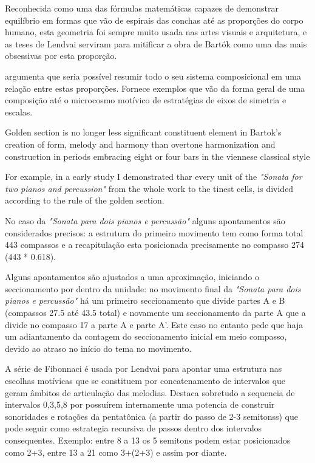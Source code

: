 \documentclass[
	12pt,				%
	openright,			%
	twoside,			%
	a4paper,			%
	english,			%
	french,				%
	spanish,			%
	brazil				%
	]{abntex2}
\begin{document}
Reconhecida como uma das fórmulas matemáticas capazes de demonstrar equilíbrio em formas que vão de espirais das conchas até as proporções do corpo humano, esta geometria foi sempre muito usada nas artes visuais e arquitetura, e as teses de Lendvai serviram para mitificar a obra de Bartók como uma das mais obsessivas por esta proporção.

 argumenta que seria possível resumir todo o seu sistema composicional em uma relação entre estas proporções. Fornece exemplos que vão da forma geral de uma composição até o microcosmo motívico de estratégias de eixos de simetria e escalas.


\begin{citacao}
Golden section is no longer less significant constituent element in Bartok's creation of form, melody and harmony than overtone harmonization and construction in periods embracing eight or four bars in the viennese classical style

For example, in a early study I demonstrated thar every unit of the \textit{"Sonata for two pianos and percussion"} from the whole work to the tinest cells, is divided according to the rule of the golden section.\cite[ p.175]{lendvai1962duality}
\end{citacao}

No caso da \textit{"Sonata para dois pianos e percussão"} alguns apontamentos são considerados precisos: a estrutura do primeiro movimento tem como forma total 443 compassos e a recapitulação esta posicionada precisamente no compasso 274 (443 * 0.618).

Alguns apontamentos são ajustados a uma aproximação, iniciando o seccionamento por dentro da unidade: no movimento final da \textit{"Sonata para dois pianos e percussão"} há um primeiro seccionamento que divide partes A e B (compassos 27.5 até 43.5 total) e novamente um seccionamento da parte A que a divide no compasso 17 a parte A e parte A'. Este caso no entanto pede que haja um adiantamento da contagem do seccionamento inicial em meio compasso, devido ao atraso no início do tema no movimento.

A série de Fibonnaci é usada por Lendvai para apontar uma estrutura nas escolhas motívicas que se constituem por concatenamento de intervalos que geram âmbitos de articulação das melodias. Destaca sobretudo a sequencia de intervalos 0,3,5,8 por possuírem internamente uma potencia de construir sonoridades e rotações da pentatônica (a partir do passo de 2-3 semitonss) que pode seguir como estrategia recursiva de passos dentro dos intervalos consequentes. Exemplo: entre 8 a 13 os 5 semitons podem estar posicionados como 2+3, entre 13 a 21 como 3+(2+3) e assim por diante.
\end{document}
